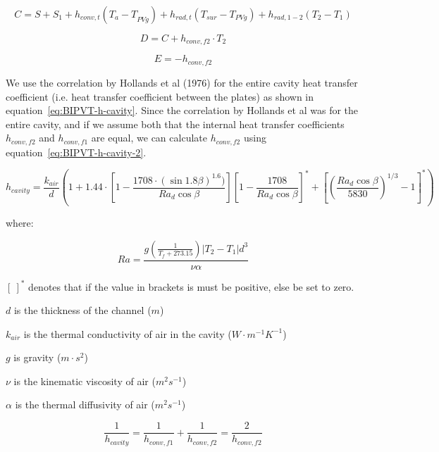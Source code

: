 \begin{equation}
C=S+S_1+h_{conv,t}\left({T_a-T}_{PVg}\right)+h_{rad,t}\left(T_{sur}-T_{PVg}\right)+h_{rad,1-2}\left(T_2-T_1\right)
\label{eq:BIPVT-C}
\end{equation}

\begin{equation}
D=C+h_{conv,f2}\cdot T_2
\label{eq:BIPVT-D}
\end{equation}

\begin{equation}
E=-h_{conv,f2}
\label{eq:BIPVT-E}
\end{equation}

We use the correlation by Hollands et al (1976) for the entire cavity heat transfer coefficient (i.e. heat transfer coefficient between the plates) as shown in equation~\ref{eq:BIPVT-h-cavity}. Since the correlation by Hollands et al was for the entire cavity, and if we assume both that the internal heat transfer coefficients \(h_{conv,f2}\) and \(h_{conv,f1}\) are equal, we can calculate \(h_{conv,f2}\) using equation~\ref{eq:BIPVT-h-cavity-2}.

\begin{equation}
h_{cavity} = \frac{k_{air}}{d}\left(1+1.44\cdot\left[1-\frac{1708\cdot\left(\sin 1.8\beta\right)^{1.6})}{Ra_{d}\cos \beta}\right]\left[1-\frac{1708}{Ra_{d}\cos \beta} \right]^{*}+\left[\left(\frac{Ra_{d}\cos\beta}{5830}\right)^{1/3}-1\right]^{*} \right)
\label{eq:BIPVT-h-cavity}
\end{equation}

where:



\begin{equation}
Ra = \frac{g \left(\frac{1}{T_{f}+273.15}\right) \left|T_{2}-T_{1}\right| d^{3}}{\nu\alpha}
\label{eq:BIPVT-Ra}
\end{equation}

\([\:]^{*}\) denotes that if the value in brackets is must be positive, else be set to zero.

\(d\) is the thickness of the channel (\(m\))

\(k_{air}\) is the thermal conductivity of air in the cavity (\(W\cdot m^{-1}K^{-1}\))

\(g\) is gravity (\(m\cdot s^{2}\))

\(\nu\) is the kinematic viscosity of air (\(m^{2}s^{-1}\))

\(\alpha\) is the thermal diffusivity of air (\(m^{2}s^{-1}\))


\begin{equation}
\frac{1}{h_{cavity}}= \frac{1}{h_{conv,f1}}+\frac{1}{h_{conv,f2}} = \frac{2}{h_{conv,f2}}
\label{eq:BIPVT-h-cavity-2}
\end{equation}

